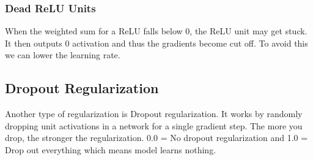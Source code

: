 \documentclass[12pt]{article}
\begin{document}
\subsubsection{Dead ReLU Units}
When the weighted sum for a ReLU falls below 0, the ReLU unit may get stuck. It then outputs 0 activation and thus the gradients become cut off. To avoid this we can lower the learning rate.
\subsection{Dropout Regularization}
Another type of regularization is Dropout regularization. It works by randomly dropping unit activations in a network for a single gradient step. The more you drop, the stronger the regularization. 0.0 = No dropout regularization and 1.0 = Drop out everything which means model learns nothing.
\end{document}
